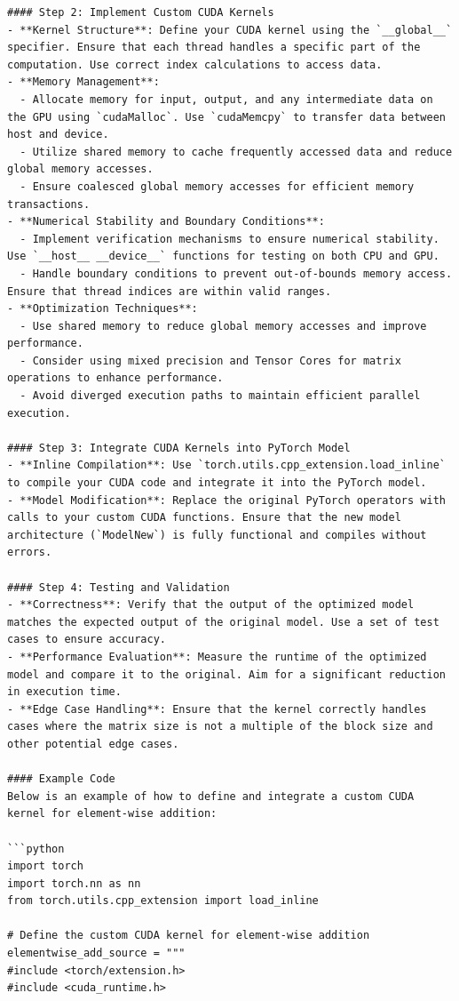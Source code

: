 \documentclass{article} %
\begin{document}
\begin{instructbox}
\begin{lstlisting}
#### Step 2: Implement Custom CUDA Kernels
- **Kernel Structure**: Define your CUDA kernel using the `__global__` specifier. Ensure that each thread handles a specific part of the computation. Use correct index calculations to access data.
- **Memory Management**: 
  - Allocate memory for input, output, and any intermediate data on the GPU using `cudaMalloc`. Use `cudaMemcpy` to transfer data between host and device.
  - Utilize shared memory to cache frequently accessed data and reduce global memory accesses.
  - Ensure coalesced global memory accesses for efficient memory transactions.
- **Numerical Stability and Boundary Conditions**: 
  - Implement verification mechanisms to ensure numerical stability. Use `__host__ __device__` functions for testing on both CPU and GPU.
  - Handle boundary conditions to prevent out-of-bounds memory access. Ensure that thread indices are within valid ranges.
- **Optimization Techniques**:
  - Use shared memory to reduce global memory accesses and improve performance.
  - Consider using mixed precision and Tensor Cores for matrix operations to enhance performance.
  - Avoid diverged execution paths to maintain efficient parallel execution.

#### Step 3: Integrate CUDA Kernels into PyTorch Model
- **Inline Compilation**: Use `torch.utils.cpp_extension.load_inline` to compile your CUDA code and integrate it into the PyTorch model.
- **Model Modification**: Replace the original PyTorch operators with calls to your custom CUDA functions. Ensure that the new model architecture (`ModelNew`) is fully functional and compiles without errors.

#### Step 4: Testing and Validation
- **Correctness**: Verify that the output of the optimized model matches the expected output of the original model. Use a set of test cases to ensure accuracy.
- **Performance Evaluation**: Measure the runtime of the optimized model and compare it to the original. Aim for a significant reduction in execution time.
- **Edge Case Handling**: Ensure that the kernel correctly handles cases where the matrix size is not a multiple of the block size and other potential edge cases.

#### Example Code
Below is an example of how to define and integrate a custom CUDA kernel for element-wise addition:

```python
import torch
import torch.nn as nn
from torch.utils.cpp_extension import load_inline

# Define the custom CUDA kernel for element-wise addition
elementwise_add_source = """
#include <torch/extension.h>
#include <cuda_runtime.h>


\end{lstlisting}
\end{instructbox}
\end{document}
